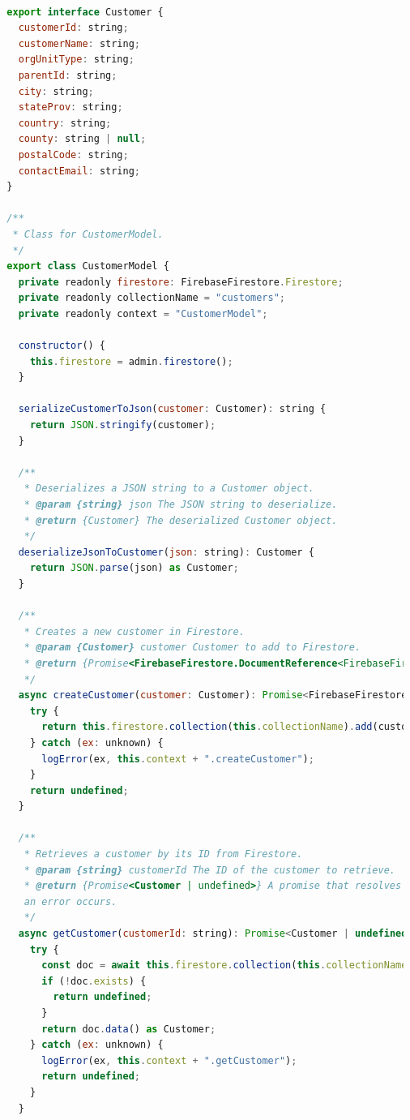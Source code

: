 \begin{lstlisting}[language=JavaScript, caption={Example of Class and Interface defined in Models}]

  export interface Customer {
    customerId: string;
    customerName: string;
    orgUnitType: string;
    parentId: string;
    city: string;
    stateProv: string;
    country: string;
    county: string | null;
    postalCode: string;
    contactEmail: string;
  }
  
  /**
   * Class for CustomerModel.
   */
  export class CustomerModel {
    private readonly firestore: FirebaseFirestore.Firestore;
    private readonly collectionName = "customers";
    private readonly context = "CustomerModel";

    constructor() {
      this.firestore = admin.firestore();
    }

    serializeCustomerToJson(customer: Customer): string {
      return JSON.stringify(customer);
    }
  
    /**
     * Deserializes a JSON string to a Customer object.
     * @param {string} json The JSON string to deserialize.
     * @return {Customer} The deserialized Customer object.
     */
    deserializeJsonToCustomer(json: string): Customer {
      return JSON.parse(json) as Customer;
    }
  
    /**
     * Creates a new customer in Firestore.
     * @param {Customer} customer Customer to add to Firestore.
     * @return {Promise<FirebaseFirestore.DocumentReference<FirebaseFirestore.DocumentData>> | undefined}.
     */
    async createCustomer(customer: Customer): Promise<FirebaseFirestore.DocumentReference<FirebaseFirestore.DocumentData> | undefined> {
      try {
        return this.firestore.collection(this.collectionName).add(customer);
      } catch (ex: unknown) {
        logError(ex, this.context + ".createCustomer");
      }
      return undefined;
    }
  
    /**
     * Retrieves a customer by its ID from Firestore.
     * @param {string} customerId The ID of the customer to retrieve.
     * @return {Promise<Customer | undefined>} A promise that resolves with the customer object if found, or undefined if not found or 
     an error occurs.
     */
    async getCustomer(customerId: string): Promise<Customer | undefined> {
      try {
        const doc = await this.firestore.collection(this.collectionName).doc(customerId).get();
        if (!doc.exists) {
          return undefined;
        }
        return doc.data() as Customer;
      } catch (ex: unknown) {
        logError(ex, this.context + ".getCustomer");
        return undefined;
      }
    }
  

\end{lstlisting}
